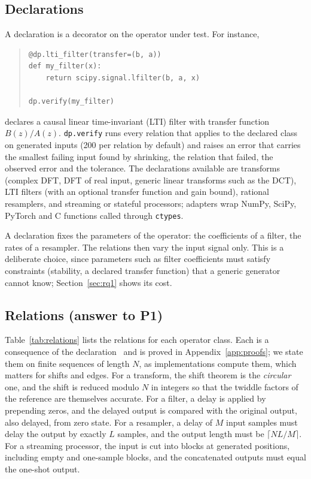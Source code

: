 \documentclass[10pt,conference]{IEEEtran}
\newcommand{\code}[1]{\texttt{#1}}
\begin{document}
\subsection{Declarations}
A declaration is a decorator on the operator under test. For instance,
\begin{quote}\footnotesize\begin{verbatim}
@dp.lti_filter(transfer=(b, a))
def my_filter(x):
    return scipy.signal.lfilter(b, a, x)

dp.verify(my_filter)
\end{verbatim}\end{quote}
declares a causal linear time-invariant (LTI) filter with transfer function
$B(z)/A(z)$. \code{dp.verify} runs every relation that applies to the declared
class on generated inputs (200 per relation by default) and raises an error
that carries the smallest failing input found by shrinking, the relation that
failed, the observed error and the tolerance. The declarations available are
transforms (complex DFT, DFT of real input, generic linear transforms such as
the DCT), LTI filters (with an optional transfer function and gain bound),
rational resamplers, and streaming or stateful processors; adapters wrap NumPy,
SciPy, PyTorch and C functions called through \code{ctypes}.

A declaration fixes the parameters of the operator: the coefficients of a
filter, the rates of a resampler. The relations then vary the input signal
only. This is a deliberate choice, since parameters such as filter
coefficients must satisfy constraints (stability, a declared transfer function)
that a generic generator cannot know; Section~\ref{sec:rq1} shows its cost.

\subsection{Relations (answer to P1)}
\label{sec:relations}
Table~\ref{tab:relations} lists the relations for each operator class. Each is
a consequence of the declaration~\cite{oppenheim2010dtsp,vaidyanathan1993multirate} and is proved in Appendix~\ref{app:proofs}; we
state them on finite sequences of length $N$, as implementations compute them,
which matters for shifts and edges. For a transform, the shift theorem is the
\emph{circular} one, and the shift is reduced modulo $N$ in integers so that the
twiddle factors of the reference are themselves accurate. For a filter, a delay
is applied by prepending zeros, and the delayed output is compared with the
original output, also delayed, from zero state. For a resampler, a delay of $M$
input samples must delay the output by exactly $L$ samples, and the output
length must be $\lceil NL/M\rceil$. For a streaming processor, the input is cut
into blocks at generated positions, including empty and one-sample blocks, and
the concatenated outputs must equal the one-shot output.
\end{document}
